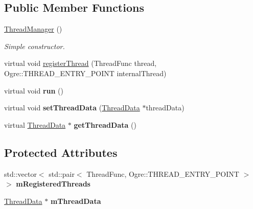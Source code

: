 \subsection*{Public Member Functions}
\begin{DoxyCompactItemize}
\item 
\mbox{\label{class_thread_manager_a613b13ebf45502e4d86c2f9317ec5871}} 
\hyperlink{class_thread_manager_a613b13ebf45502e4d86c2f9317ec5871}{Thread\+Manager} ()
\begin{DoxyCompactList}\small\item\em Simple constructor. \end{DoxyCompactList}\item 
virtual void \hyperlink{class_thread_manager_a7f63f89915ef17f37f741ae29c19682f}{register\+Thread} (Thread\+Func thread, Ogre\+::\+T\+H\+R\+E\+A\+D\+\_\+\+E\+N\+T\+R\+Y\+\_\+\+P\+O\+I\+NT internal\+Thread)
\item 
\mbox{\label{class_thread_manager_afec21d2b814f77ef06221f0529e6e8b4}} 
virtual void {\bfseries run} ()
\item 
\mbox{\label{class_thread_manager_a3dbe938c3fa9b2202d84c5b623db74a4}} 
virtual void {\bfseries set\+Thread\+Data} (\hyperlink{struct_thread_data}{Thread\+Data} $\ast$thread\+Data)
\item 
\mbox{\label{class_thread_manager_a00c6fbd9feafca3e5408bc7a0fa7d0e5}} 
virtual \hyperlink{struct_thread_data}{Thread\+Data} $\ast$ {\bfseries get\+Thread\+Data} ()
\end{DoxyCompactItemize}
\subsection*{Protected Attributes}
\begin{DoxyCompactItemize}
\item 
\mbox{\label{class_thread_manager_a6b3e5e01419d3419ac09cefc6748f9e0}} 
std\+::vector$<$ std\+::pair$<$ Thread\+Func, Ogre\+::\+T\+H\+R\+E\+A\+D\+\_\+\+E\+N\+T\+R\+Y\+\_\+\+P\+O\+I\+NT $>$ $>$ {\bfseries m\+Registered\+Threads}
\item 
\mbox{\label{class_thread_manager_a8bce7db0b6a5369556a31d906cb30ff1}} 
\hyperlink{struct_thread_data}{Thread\+Data} $\ast$ {\bfseries m\+Thread\+Data}
\end{DoxyCompactItemize}


